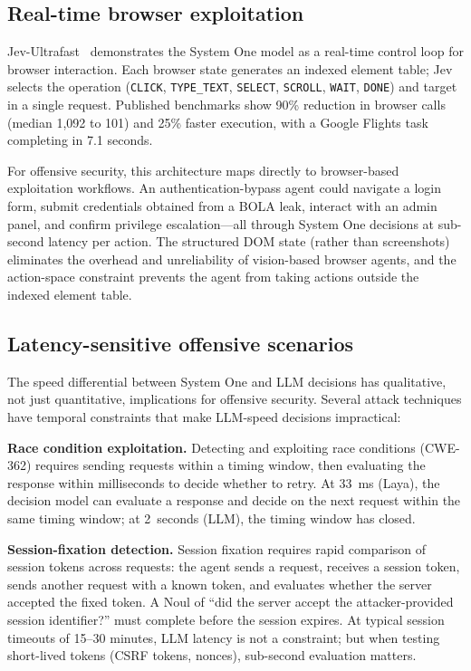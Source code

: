 \documentclass[conference]{IEEEtran}
\begin{document}
\subsection{Real-time browser exploitation}

Jev-Ultrafast~\cite{browseruse2026} demonstrates the System One model as a real-time control loop for browser interaction. Each browser state generates an indexed element table; Jev selects the operation (\texttt{CLICK}, \texttt{TYPE\_TEXT}, \texttt{SELECT}, \texttt{SCROLL}, \texttt{WAIT}, \texttt{DONE}) and target in a single request. Published benchmarks show 90\% reduction in browser calls (median 1,092 to 101) and 25\% faster execution, with a Google Flights task completing in 7.1 seconds.

For offensive security, this architecture maps directly to browser-based exploitation workflows. An authentication-bypass agent could navigate a login form, submit credentials obtained from a BOLA leak, interact with an admin panel, and confirm privilege escalation---all through System One decisions at sub-second latency per action. The structured DOM state (rather than screenshots) eliminates the overhead and unreliability of vision-based browser agents, and the action-space constraint prevents the agent from taking actions outside the indexed element table.

\subsection{Latency-sensitive offensive scenarios}

The speed differential between System One and LLM decisions has qualitative, not just quantitative, implications for offensive security. Several attack techniques have temporal constraints that make LLM-speed decisions impractical:

\textbf{Race condition exploitation.} Detecting and exploiting race conditions (CWE-362) requires sending requests within a timing window, then evaluating the response within milliseconds to decide whether to retry. At 33~ms (Laya), the decision model can evaluate a response and decide on the next request within the same timing window; at 2~seconds (LLM), the timing window has closed.

\textbf{Session-fixation detection.} Session fixation requires rapid comparison of session tokens across requests: the agent sends a request, receives a session token, sends another request with a known token, and evaluates whether the server accepted the fixed token. A Noul of ``did the server accept the attacker-provided session identifier?'' must complete before the session expires. At typical session timeouts of 15--30 minutes, LLM latency is not a constraint; but when testing short-lived tokens (CSRF tokens, nonces), sub-second evaluation matters.
\end{document}
